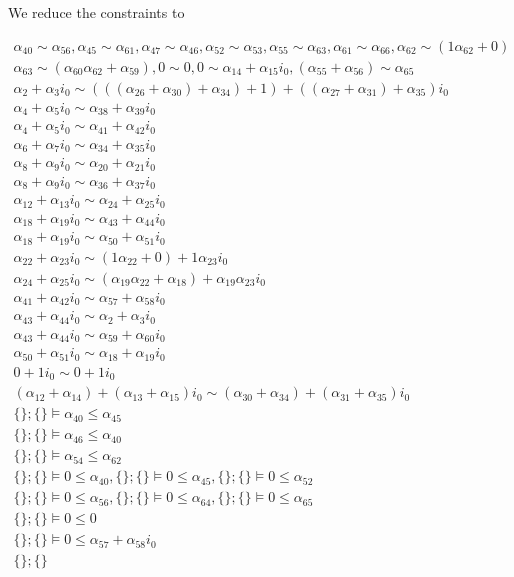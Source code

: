 We reduce the constraints to

{\tiny
\begin{align*}
    \alpha_{40} \sim \alpha_{56}, \alpha_{45} \sim \alpha_{61}, \alpha_{47} \sim \alpha_{46}, \alpha_{52} \sim \alpha_{53}, \alpha_{55} \sim \alpha_{63}, \alpha_{61} \sim \alpha_{66}, \alpha_{62} \sim (1\alpha_{62}+0)\\ 
    \alpha_{63} \sim (\alpha_{60}\alpha_{62}+\alpha_{59}), 0 \sim 0, 0 \sim \alpha_{14} + \alpha_{15}i_{0}, (\alpha_{55}+\alpha_{56}) \sim \alpha_{65}\\ \alpha_{2} + \alpha_{3}i_{0} \sim (((\alpha_{26}+\alpha_{30})+\alpha_{34})+1) + ((\alpha_{27}+\alpha_{31})+\alpha_{35})i_{0}\\ \alpha_{4} + \alpha_{5}i_{0} \sim \alpha_{38} + \alpha_{39}i_{0}\\ \alpha_{4} + \alpha_{5}i_{0} \sim \alpha_{41} + \alpha_{42}i_{0}\\ \alpha_{6} + \alpha_{7}i_{0} \sim \alpha_{34} + \alpha_{35}i_{0}\\ \alpha_{8} + \alpha_{9}i_{0} \sim \alpha_{20} + \alpha_{21}i_{0}\\ \alpha_{8} + \alpha_{9}i_{0} \sim \alpha_{36} + \alpha_{37}i_{0}\\ \alpha_{12} + \alpha_{13}i_{0} \sim \alpha_{24} + \alpha_{25}i_{0}\\ \alpha_{18} + \alpha_{19}i_{0} \sim \alpha_{43} + \alpha_{44}i_{0}\\ \alpha_{18} + \alpha_{19}i_{0} \sim \alpha_{50} + \alpha_{51}i_{0}\\ \alpha_{22} + \alpha_{23}i_{0} \sim (1\alpha_{22}+0) + 1\alpha_{23}i_{0}\\ \alpha_{24} + \alpha_{25}i_{0} \sim (\alpha_{19}\alpha_{22}+\alpha_{18}) + \alpha_{19}\alpha_{23}i_{0}\\ \alpha_{41} + \alpha_{42}i_{0} \sim \alpha_{57} + \alpha_{58}i_{0}\\ \alpha_{43} + \alpha_{44}i_{0} \sim \alpha_{2} + \alpha_{3}i_{0}\\ \alpha_{43} + \alpha_{44}i_{0} \sim \alpha_{59} + \alpha_{60}i_{0}\\ \alpha_{50} + \alpha_{51}i_{0} \sim \alpha_{18} + \alpha_{19}i_{0}\\ 0 + 1i_{0} \sim 0 + 1i_{0}\\ (\alpha_{12}+\alpha_{14}) + (\alpha_{13}+\alpha_{15})i_{0} \sim (\alpha_{30}+\alpha_{34}) + (\alpha_{31}+\alpha_{35})i_{0}\\ \{\};\{\}  \vDash \alpha_{40} \leq \alpha_{45}\\ \{\};\{\}  \vDash \alpha_{46} \leq \alpha_{40}\\ \{\};\{\}  \vDash \alpha_{54} \leq \alpha_{62}\\ \{\};\{\}  \vDash 0 \leq \alpha_{40}, \{\};\{\}  \vDash 0 \leq \alpha_{45}, \{\};\{\}  \vDash 0 \leq \alpha_{52}\\ \{\};\{\}  \vDash 0 \leq \alpha_{56}, \{\};\{\}  \vDash 0 \leq \alpha_{64}, \{\};\{\}  \vDash 0 \leq \alpha_{65}\\ \{\};\{\}  \vDash 0 \leq 0\\ \{\};\{\}  \vDash 0 \leq \alpha_{57} + \alpha_{58}i_{0}\\ \{\};\{\}  
\end{align*}}
